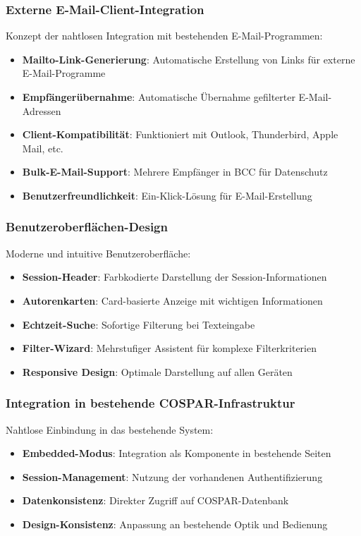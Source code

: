 \documentclass[11pt,a4paper]{article}
\begin{document}
\subsubsection{Externe E-Mail-Client-Integration}
Konzept der nahtlosen Integration mit bestehenden E-Mail-Programmen:
\begin{itemize}
    \item \textbf{Mailto-Link-Generierung}: Automatische Erstellung von Links für externe E-Mail-Programme
    \item \textbf{Empfängerübernahme}: Automatische Übernahme gefilterter E-Mail-Adressen
    \item \textbf{Client-Kompatibilität}: Funktioniert mit Outlook, Thunderbird, Apple Mail, etc.
    \item \textbf{Bulk-E-Mail-Support}: Mehrere Empfänger in BCC für Datenschutz
    \item \textbf{Benutzerfreundlichkeit}: Ein-Klick-Lösung für E-Mail-Erstellung
\end{itemize}

\subsubsection{Benutzeroberflächen-Design}
Moderne und intuitive Benutzeroberfläche:
\begin{itemize}
    \item \textbf{Session-Header}: Farbkodierte Darstellung der Session-Informationen
    \item \textbf{Autorenkarten}: Card-basierte Anzeige mit wichtigen Informationen
    \item \textbf{Echtzeit-Suche}: Sofortige Filterung bei Texteingabe
    \item \textbf{Filter-Wizard}: Mehrstufiger Assistent für komplexe Filterkriterien
    \item \textbf{Responsive Design}: Optimale Darstellung auf allen Geräten
\end{itemize}

\subsubsection{Integration in bestehende COSPAR-Infrastruktur}
Nahtlose Einbindung in das bestehende System:
\begin{itemize}
    \item \textbf{Embedded-Modus}: Integration als Komponente in bestehende Seiten
    \item \textbf{Session-Management}: Nutzung der vorhandenen Authentifizierung
    \item \textbf{Datenkonsistenz}: Direkter Zugriff auf COSPAR-Datenbank
    \item \textbf{Design-Konsistenz}: Anpassung an bestehende Optik und Bedienung
\end{itemize}
\end{document}
